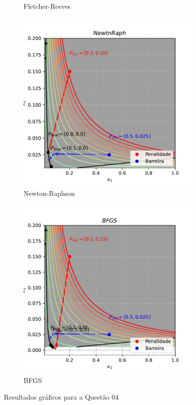 \documentclass[10pt, a4paper]{article}
\begin{document}
\begin{figure}[htpb]
\begin{subfigure}[b]{0.32\textwidth}
    \caption{Fletcher-Reeves}
    \label{fig:q4_fletchrvs}
  \end{subfigure}
  \hfill
  \begin{subfigure}[b]{0.32\textwidth}
    \centering
    \includegraphics[width=\textwidth]{images/q4_NewtnRaph.pdf}
    \caption{Newton-Raphson}
    \label{fig:q4_newtnraph}
  \end{subfigure}
  \hfill
  \begin{subfigure}[b]{0.32\textwidth}
    \centering
    \includegraphics[width=\textwidth]{images/q4_BFGS.pdf}
    \caption{BFGS}
    \label{fig:q4_bfgs}
  \end{subfigure}
     \caption{Resultados gráficos para a Questão 04}
     \label{fig:q4}
\end{figure}






\end{document}
